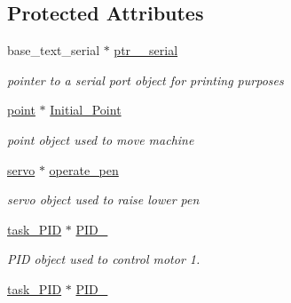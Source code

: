 \subsection*{Protected Attributes}
\begin{DoxyCompactItemize}
\item 
\hypertarget{classtask__lines_acdace444a5715561b80dd929aabb6813}{base\-\_\-text\-\_\-serial $\ast$ \hyperlink{classtask__lines_acdace444a5715561b80dd929aabb6813}{ptr\-\_\-\_\-serial}}\label{classtask__lines_acdace444a5715561b80dd929aabb6813}

\begin{DoxyCompactList}\small\item\em pointer to a serial port object for printing purposes \end{DoxyCompactList}\item 
\hypertarget{classtask__lines_adf126ba6072b70e5525f470bc0d5fd90}{\hyperlink{classpoint}{point} $\ast$ \hyperlink{classtask__lines_adf126ba6072b70e5525f470bc0d5fd90}{Initial\-\_\-\-Point}}\label{classtask__lines_adf126ba6072b70e5525f470bc0d5fd90}

\begin{DoxyCompactList}\small\item\em point object used to move machine \end{DoxyCompactList}\item 
\hypertarget{classtask__lines_ac6c15e2f9c29419c3790196ad18b24dd}{\hyperlink{classservo}{servo} $\ast$ \hyperlink{classtask__lines_ac6c15e2f9c29419c3790196ad18b24dd}{operate\-\_\-pen}}\label{classtask__lines_ac6c15e2f9c29419c3790196ad18b24dd}

\begin{DoxyCompactList}\small\item\em servo object used to raise lower pen \end{DoxyCompactList}\item 
\hypertarget{classtask__lines_af20c4404da342292d6e8e8a7a6004af2}{\hyperlink{classtask___p_i_d}{task\-\_\-\-P\-I\-D} $\ast$ \hyperlink{classtask__lines_af20c4404da342292d6e8e8a7a6004af2}{P\-I\-D\-\_}}\label{classtask__lines_af20c4404da342292d6e8e8a7a6004af2}

\begin{DoxyCompactList}\small\item\em P\-I\-D object used to control motor 1. \end{DoxyCompactList}\item 
\hypertarget{classtask__lines_ac53057e78b84eeb3576ee7ffb2380981}{\hyperlink{classtask___p_i_d}{task\-\_\-\-P\-I\-D} $\ast$ \hyperlink{classtask__lines_ac53057e78b84eeb3576ee7ffb2380981}{P\-I\-D\-\_}}\label{classtask__lines_ac53057e78b84eeb3576ee7ffb2380981}


\end{DoxyCompactItemize}

